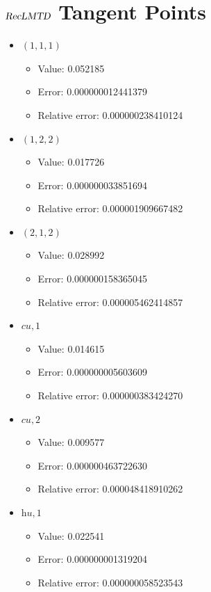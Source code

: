 \documentclass{article}%
\begin{document}
\section{$\textsl{RecLMTD}$ Tangent Points}%
\thispagestyle{plain}%
\begin{itemize}%
	\item $(1, 1, 1)$%
	\begin{itemize}%
		\item Value: 0.052185%
		\item Error: 0.000000012441379%
		\item Relative error: 0.000000238410124%
	\end{itemize}%
	\item $(1, 2, 2)$%
	\begin{itemize}%
		\item Value: 0.017726%
		\item Error: 0.000000033851694%
		\item Relative error: 0.000001909667482%
	\end{itemize}%
	\item $(2, 1, 2)$%
	\begin{itemize}%
		\item Value: 0.028992%
		\item Error: 0.000000158365045%
		\item Relative error: 0.000005462414857%
	\end{itemize}%
	\item $\textit{cu},1$%
	\begin{itemize}%
		\item Value: 0.014615%
		\item Error: 0.000000005603609%
		\item Relative error: 0.000000383424270%
	\end{itemize}%
	\item $\textit{cu},2$%
	\begin{itemize}%
		\item Value: 0.009577%
		\item Error: 0.000000463722630%
		\item Relative error: 0.000048418910262%
	\end{itemize}%
	\item $\textit{hu},1$%
	\begin{itemize}%
		\item Value: 0.022541%
		\item Error: 0.000000001319204%
		\item Relative error: 0.000000058523543%
	\end{itemize}%
\end{itemize}%
\end{document}
